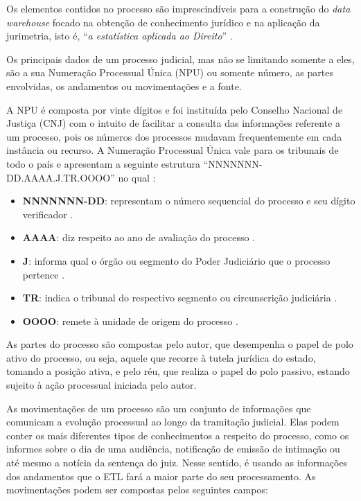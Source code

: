 Os elementos contidos no processo são imprescindíveis para a construção do \textit{data warehouse} focado na obtenção de conhecimento jurídico e na aplicação da jurimetria, isto é, \enquote{\textit{a estatística aplicada ao Direito}} \cite{newlawJurimetria}.

Os principais dados de um processo judicial, mas não se limitando somente a eles, são a sua Numeração Processual Única (NPU) ou somente número, as partes envolvidas, os andamentos ou movimentações e a fonte.

A NPU é composta por vinte dígitos e foi instituída pelo Conselho Nacional de Justiça (CNJ) com o intuito de facilitar a consulta das informações referente a um processo, pois os números dos processos mudavam frequentemente em cada instância ou recurso. A Numeração Processual Única vale para os tribunais de todo o país e apresentam a seguinte estrutura \enquote{NNNNNNN-DD.AAAA.J.TR.OOOO} no qual \cite{jusbrasilNPU}:

\begin{itemize}
    \item \textbf{NNNNNNN-DD}: representam o número sequencial do processo e seu dígito verificador \cite{TRF4NPU}.
    \item \textbf{AAAA}: diz respeito ao ano de avaliação do processo \cite{TRF4NPU}.
    \item \textbf{J}: informa qual o órgão ou segmento do Poder Judiciário que o processo pertence \cite{TRF4NPU}.
    \item \textbf{TR}: indica o tribunal do respectivo segmento ou circunscrição judiciária \cite{TRF4NPU}.
    \item \textbf{OOOO}: remete à unidade de origem do processo \cite{TRF4NPU}.
\end{itemize}

As partes do processo são compostas pelo autor, que desempenha o papel de polo ativo do processo, ou seja, aquele que recorre à tutela jurídica do estado, tomando a posição ativa, e pelo réu, que realiza o papel do polo passivo, estando sujeito à ação processual iniciada pelo autor.

As movimentações de um processo são um conjunto de informações que comunicam a evolução processual ao longo da tramitação judicial. Elas podem conter os mais diferentes tipos de conhecimentos a respeito do processo, como os informes sobre o dia de uma audiência, notificação de emissão de intimação ou até mesmo a notícia da sentença do juiz. Nesse sentido, é usando as informações dos andamentos que o ETL fará a maior parte do seu processamento. As movimentações podem ser compostas pelos seguintes campos: 

